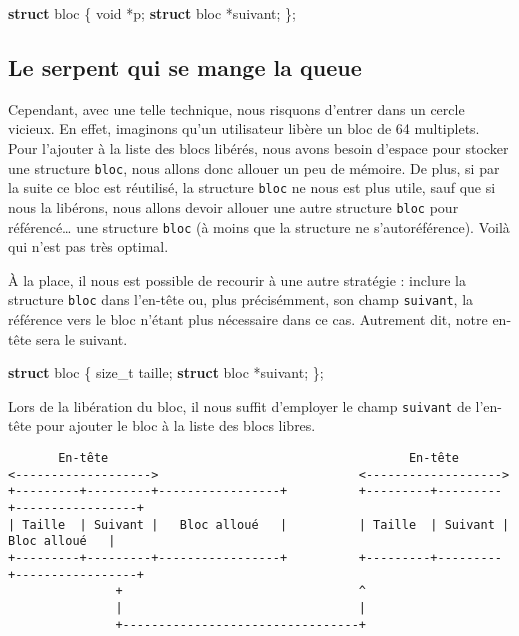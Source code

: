 \documentclass[]{article}
\newenvironment{Shaded}{}{}
\newcommand{\KeywordTok}[1]{\textcolor[rgb]{0.00,0.44,0.13}{\textbf{{#1}}}}
\newcommand{\DataTypeTok}[1]{\textcolor[rgb]{0.56,0.13,0.00}{{#1}}}
\newcommand{\NormalTok}[1]{{#1}}
\begin{document}
\begin{Shaded}
\begin{Highlighting}[]
\KeywordTok{struct} \NormalTok{bloc}
\NormalTok{\{}
    \DataTypeTok{void} \NormalTok{*p;}
    \KeywordTok{struct} \NormalTok{bloc *suivant;}
\NormalTok{\};}
\end{Highlighting}
\end{Shaded}

\subsection{Le serpent qui se mange la
queue}\label{le-serpent-qui-se-mange-la-queue}

Cependant, avec une telle technique, nous risquons d'entrer dans un
cercle vicieux. En effet, imaginons qu'un utilisateur libère un bloc de
64 multiplets. Pour l'ajouter à la liste des blocs libérés, nous avons
besoin d'espace pour stocker une structure \texttt{bloc}, nous allons
donc allouer un peu de mémoire. De plus, si par la suite ce bloc est
réutilisé, la structure \texttt{bloc} ne nous est plus utile, sauf que
si nous la libérons, nous allons devoir allouer une autre structure
\texttt{bloc} pour référencé\ldots{} une structure \texttt{bloc} (à
moins que la structure ne s'autoréférence). Voilà qui n'est pas très
optimal.

À la place, il nous est possible de recourir à une autre stratégie :
inclure la structure \texttt{bloc} dans l'en-tête ou, plus précisémment,
son champ \texttt{suivant}, la référence vers le bloc n'étant plus
nécessaire dans ce cas. Autrement dit, notre en-tête sera le suivant.

\begin{Shaded}
\begin{Highlighting}[]
\KeywordTok{struct} \NormalTok{bloc}
\NormalTok{\{}
    \DataTypeTok{size_t} \NormalTok{taille;}
    \KeywordTok{struct} \NormalTok{bloc *suivant;}
\NormalTok{\};}
\end{Highlighting}
\end{Shaded}

Lors de la libération du bloc, il nous suffit d'employer le champ
\texttt{suivant} de l'en-tête pour ajouter le bloc à la liste des blocs
libres.

\begin{verbatim}
       En-tête                                          En-tête
<------------------->                            <------------------->
+---------+---------+-----------------+          +---------+---------+-----------------+
| Taille  | Suivant |   Bloc alloué   |          | Taille  | Suivant |   Bloc alloué   |
+---------+---------+-----------------+          +---------+---------+-----------------+
               +                                 ^
               |                                 |
               +---------------------------------+
\end{verbatim}
\end{document}
